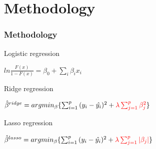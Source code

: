 \documentclass[xcolor={x11names,svgnames,dvipsnames}]{beamer}
\begin{document}
\section{Methodology}

\begin{frame}
\frametitle{Methodology}
%
\begin{block}{Logistic regression}
\begin{center}
$ln{\frac{F(x)}{1-F(x)}}=\beta_0+\sum_i\beta_ix_i$\\
\end{center}
\end{block}

\begin{block}{Ridge regression}
\begin{center}
$\hat{\beta}^{ridge}=argmin_{\beta}\{\sum_{i=1}^p{(y_i-\hat{y_i})^2}+{\color{red}\lambda \sum_{j=1}^p\beta_j^2}\}$
\\
\end{center}
\end{block}

\begin{block}{Lasso regression}
\begin{center}
$\hat{\beta}^{lasso}=argmin_{\beta}\{\sum_{i=1}^p{(y_i-\hat{y_i})^2}+{\color{red}\lambda\sum_{j=1}^p |\beta_j|}\}$\\
\end{center}
\end{block}

\end{frame}
\end{document}
